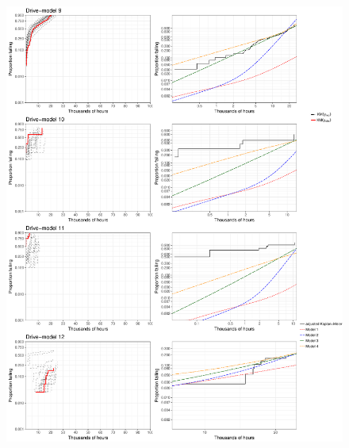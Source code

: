 \documentclass[12pt]{article}
\begin{document}
\begin{figure}[H]
\includegraphics[width=\textwidth]{ppcheck-v3-3.pdf}
\end{figure}
\end{document}
